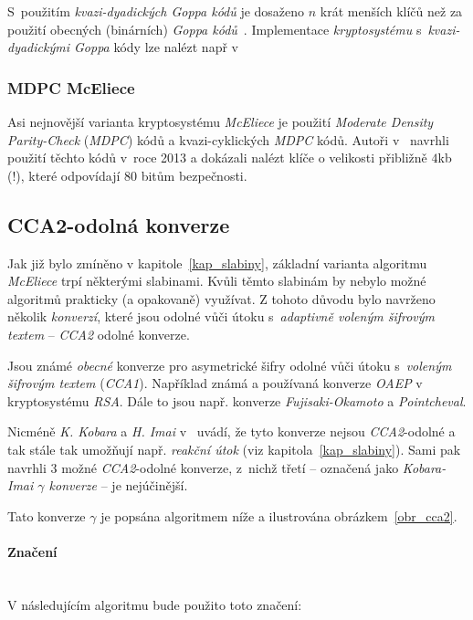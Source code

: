 \documentclass[thesis=M,czech,hidelinks]{FITthesis}[2012/06/26]
\newcommand{\0}{{\textcolor[gray]{0.80}{0}}}
\begin{document}
S~použitím \emph{kvazi-dyadických Goppa kódů} je dosaženo $n$ krát menších klíčů
než za použití obecných (binárních) \emph{Goppa kódů}~\cite{Misoczki1}.
Implementace \emph{kryptosystému} s~\emph{kvazi-dyadickými Goppa} kódy lze
nalézt např v~\cite{Paustjan,Kratochvil}

\subsubsection{MDPC McEliece}
Asi nejnovější varianta kryptosystému \emph{McEliece} je použití \emph{Moderate
Density Parity-Check} (\emph{MDPC}) kódů a kvazi-cyklických \emph{MDPC} kódů.
Autoři v~\cite{Misoczki2} navrhli použití těchto kódů v~roce 2013 a dokázali
nalézt klíče o velikosti přibližně $4$\;kb (!), které odpovídají $80$ bitům
bezpečnosti.


\subsection{CCA2-odolná konverze}\label{kap_cca2}
Jak již bylo zmíněno v kapitole~\ref{kap_slabiny}, základní varianta algoritmu
\emph{McEliece} trpí některými slabinami. Kvůli těmto slabinám by nebylo možné
algoritmů prakticky (a opakovaně) využívat. Z tohoto důvodu bylo navrženo
několik \emph{konverzí}, které jsou odolné vůči útoku s~\emph{adaptivně voleným
šifrovým textem} -- \emph{CCA2} odolné konverze.

Jsou známé \emph{obecné} konverze pro asymetrické šifry odolné vůči útoku
s~\emph{voleným šifrovým textem} (\emph{CCA1}). Například známá a  používaná
konverze \emph{OAEP} v kryptosystému \emph{RSA}. Dále to jsou např. konverze
\emph{Fujisaki-Okamoto} a \emph{Pointcheval}.

Nicméně \emph{K. Kobara} a \emph{H. Imai} v~\cite{Kobara} uvádí, že tyto
konverze nejsou \emph{CCA2}-odolné a tak stále tak umožňují např. \emph{reakční
útok} (viz kapitola~\ref{kap_slabiny}). Sami pak navrhli 3 možné
\emph{CCA2}-odolné konverze, z~nichž třetí -- označená jako \emph{Kobara-Imai
$\gamma$ konverze} -- je nejúčinější.

Tato konverze $\gamma$ je popsána algoritmem níže a ilustrována
obrázkem~\ref{obr_cca2}.

\paragraph{Značení} \hfil \\
V následujícím algoritmu bude použito toto značení:
\end{document}

